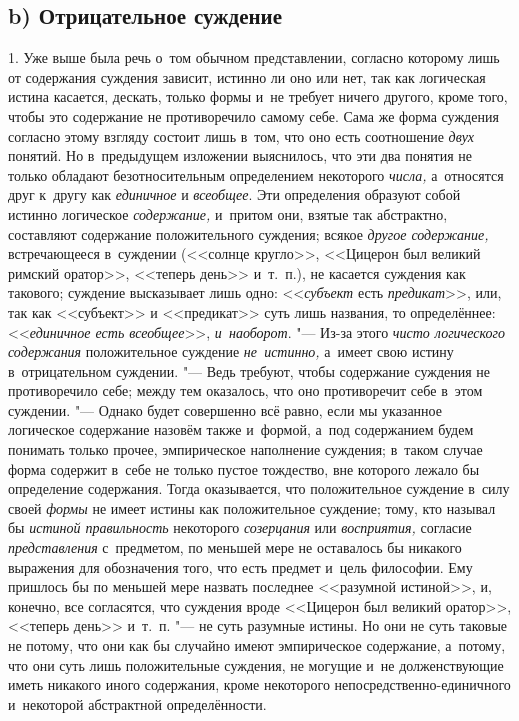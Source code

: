 \subsection[b) Отрицательное суждение]{b) Отрицательное суждение}

1. Уже выше была речь о~том обычном представлении, согласно
которому лишь от содержания суждения зависит, истинно ли оно или нет, так
как логическая истина касается, дескать, только формы и~не требует ничего
другого, кроме того, чтобы это содержание не противоречило самому себе.
Сама же форма суждения согласно этому взгляду состоит лишь в~том, что оно
есть соотношение {\em двух} понятий. Но в~предыдущем изложении выяснилось, что
эти два понятия не только обладают безотносительным определением некоторого
{\em числа,} а~относятся друг к~другу как {\em единичное} и {\em всеобщее}.
Эти определения образуют собой истинно логическое {\em содержание,} и~притом
они, взятые так абстрактно, составляют содержание положительного суждения;
всякое {\em другое содержание,} встречающееся в~суждении (<<солнце кругло>>,
<<Цицерон был великий римский оратор>>, <<теперь день>> и~т.~п.), не касается
суждения как такового; суждение высказывает лишь одно: <<{\em субъект} есть
{\em предикат}>>, или, так как <<субъект>> и <<предикат>> суть лишь названия,
то определённее: <<{\em единичное есть всеобщее}>>, {\em и~наоборот}. "---
Из-за этого {\em чисто логического содержания} положительное суждение
{\em не~истинно,} а~имеет свою истину в~отрицательном суждении. "--- Ведь
требуют, чтобы содержание суждения не противоречило себе; между тем оказалось,
что оно противоречит себе в~этом суждении. "--- Однако будет совершенно
всё равно, если мы указанное логическое содержание назовём также и~формой,
а~под содержанием будем понимать только прочее, эмпирическое наполнение
суждения; в~таком случае форма содержит в~себе не только пустое тождество,
вне которого лежало бы определение содержания. Тогда оказывается, что
положительное суждение в~силу своей {\em формы} не имеет
истины как положительное суждение; тому, кто называл бы
{\em истиной правильность} некоторого {\em созерцания} или
{\em восприятия,} согласие {\em представления} с~предметом,
по меньшей мере не оставалось бы никакого выражения для
обозначения того, что есть предмет и~цель философии. Ему пришлось бы по
меньшей мере назвать последнее <<разумной истиной>>, и, конечно, все
согласятся, что суждения вроде <<Цицерон был великий оратор>>, <<теперь день>>
и~т.~п. "--- не суть разумные истины. Но они не суть таковые не
потому, что они как бы случайно имеют эмпирическое содержание, а~потому,
что они суть лишь положительные суждения, не могущие и~не долженствующие
иметь никакого иного содержания, кроме некоторого
непосредственно-единичного и~некоторой абстрактной определённости.

